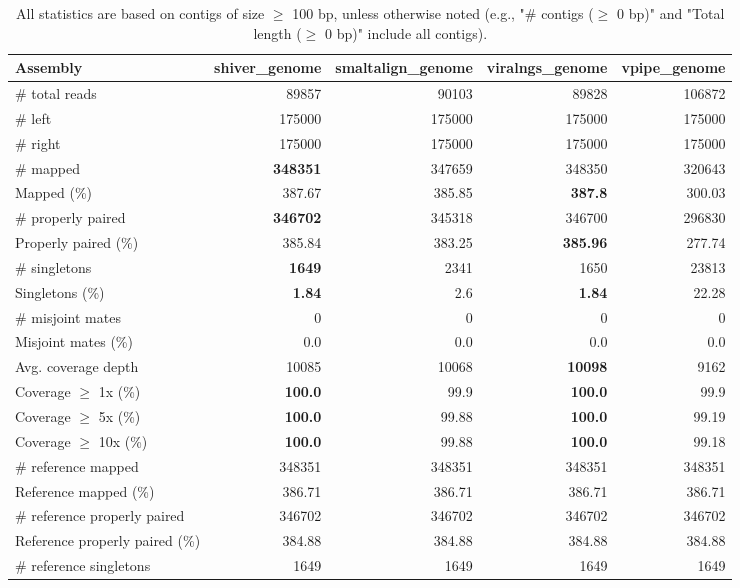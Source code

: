 \documentclass[12pt,a4paper]{article}
\begin{document}
\begin{table}[ht]
\begin{center}
\caption{All statistics are based on contigs of size $\geq$ 100 bp, unless otherwise noted (e.g., "\# contigs ($\geq$ 0 bp)" and "Total length ($\geq$ 0 bp)" include all contigs).}
\begin{tabular}{|l*{4}{|r}|}
\hline
Assembly & shiver\_genome & smaltalign\_genome & viralngs\_genome & vpipe\_genome \\ \hline
\# total reads & 89857 & 90103 & 89828 & 106872 \\ \hline
\# left & 175000 & 175000 & 175000 & 175000 \\ \hline
\# right & 175000 & 175000 & 175000 & 175000 \\ \hline
\# mapped & {\bf 348351} & 347659 & 348350 & 320643 \\ \hline
Mapped (\%) & 387.67 & 385.85 & {\bf 387.8} & 300.03 \\ \hline
\# properly paired & {\bf 346702} & 345318 & 346700 & 296830 \\ \hline
Properly paired (\%) & 385.84 & 383.25 & {\bf 385.96} & 277.74 \\ \hline
\# singletons & {\bf 1649} & 2341 & 1650 & 23813 \\ \hline
Singletons (\%) & {\bf 1.84} & 2.6 & {\bf 1.84} & 22.28 \\ \hline
\# misjoint mates & 0 & 0 & 0 & 0 \\ \hline
Misjoint mates (\%) & 0.0 & 0.0 & 0.0 & 0.0 \\ \hline
Avg. coverage depth & 10085 & 10068 & {\bf 10098} & 9162 \\ \hline
Coverage $\geq$ 1x (\%) & {\bf 100.0} & 99.9 & {\bf 100.0} & 99.9 \\ \hline
Coverage $\geq$ 5x (\%) & {\bf 100.0} & 99.88 & {\bf 100.0} & 99.19 \\ \hline
Coverage $\geq$ 10x (\%) & {\bf 100.0} & 99.88 & {\bf 100.0} & 99.18 \\ \hline
\# reference mapped & 348351 & 348351 & 348351 & 348351 \\ \hline
Reference mapped (\%) & 386.71 & 386.71 & 386.71 & 386.71 \\ \hline
\# reference properly paired & 346702 & 346702 & 346702 & 346702 \\ \hline
Reference properly paired (\%) & 384.88 & 384.88 & 384.88 & 384.88 \\ \hline
\# reference singletons & 1649 & 1649 & 1649 & 1649 \\ \hline

\end{tabular}
\end{center}
\end{table}
\end{document}
